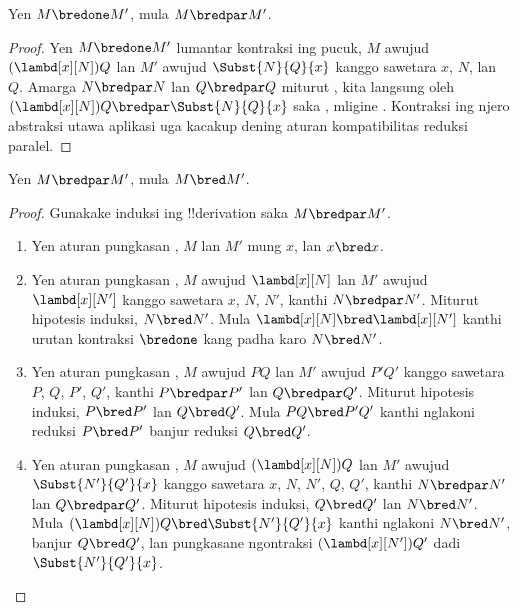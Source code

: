 \documentclass[../../../include/open-logic-section]{subfiles}
\begin{document}


\begin{lem}
  Yen $M \bredone M'$, mula
  $M \bredpar M'$.
\end{lem}
\begin{proof} Yen $M \bredone M'$
    lumantar kontraksi ing pucuk,
    $M$ awujud $(\lambd[x][N])Q$
    lan $M'$ awujud
    $\Subst{N}{Q}{x}$ kanggo
    sawetara $x$, $N$, lan~$Q$.
    Amarga $N \bredpar N$ lan
    $Q \bredpar Q$ miturut
    ,
    kita langsung oleh
    $(\lambd[x][N])Q
    \bredpar \Subst{N}{Q}{x}$
    saka ,
    mligine .
    Kontraksi ing njero
    abstraksi utawa aplikasi
    uga kacakup dening aturan
    kompatibilitas reduksi paralel.
\end{proof}

\begin{lem}
  Yen $M \bredpar M'$, mula
  $M \bred M'$.
\end{lem}

\begin{proof} Gunakake induksi ing !!{derivation}
  saka $M \bredpar M'$.
  \begin{enumerate}
  \item Yen aturan pungkasan
    ,
    $M$ lan $M'$ mung $x$,
    lan $x \bred x$.
  \item Yen aturan pungkasan
    ,
    $M$ awujud
    $\lambd[x][N]$ lan
    $M'$ awujud
    $\lambd[x][N']$
    kanggo sawetara $x$,
    $N$, $N'$, kanthi
    $N \bredpar N'$.
    Miturut hipotesis induksi,
    $N \bred N'$.
    Mula $\lambd[x][N] \bred
    \lambd[x][N']$ kanthi
    urutan kontraksi
    $\bredone$ kang padha
    karo $N \bred N'$.
  \item Yen aturan pungkasan
    ,
    $M$ awujud $PQ$
    lan $M'$ awujud
    $P'Q'$ kanggo
    sawetara $P$, $Q$,
    $P'$, $Q'$, kanthi
    $P \bredpar P'$ lan
    $Q \bredpar Q'$.
    Miturut hipotesis induksi,
    $P \bred P'$ lan
    $Q \bred Q'$.
    Mula $PQ \bred P'Q'$
    kanthi nglakoni
    reduksi $P \bred P'$
    banjur reduksi
    $Q \bred Q'$.
  \item Yen aturan pungkasan
    ,
    $M$ awujud
    $(\lambd[x][N])Q$
    lan $M'$ awujud
    $\Subst{N'}{Q'}{x}$
    kanggo sawetara $x$,
    $N$, $N'$, $Q$, $Q'$,
    kanthi $N \bredpar N'$
    lan $Q \bredpar Q'$.
    Miturut hipotesis induksi,
    $Q \bred Q'$ lan
    $N \bred N'$.
    Mula $(\lambd[x][N])Q
    \bred \Subst{N'}{Q'}{x}$
    kanthi nglakoni
    $N \bred N'$, banjur
    $Q \bred Q'$, lan
    pungkasane ngontraksi
    $(\lambd[x][N'])Q'$
    dadi $\Subst{N'}{Q'}{x}$.
  \end{enumerate}
\end{proof}
\end{document}
